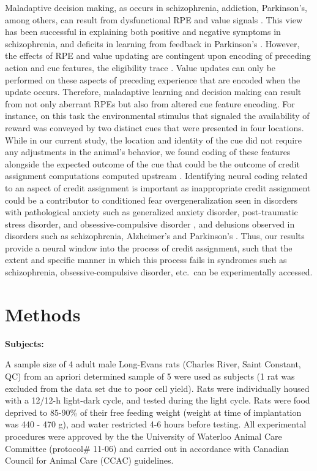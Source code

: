 \documentclass[11pt]{article}
\let\cite=\citep
\begin{document}
Maladaptive decision making, as occurs in schizophrenia, addiction, Parkinson's, among others, can result from dysfunctional RPE and value signals \cite{Frank2004,Gradin2011,Maia2011}. This view has been successful in explaining both positive and negative symptoms in schizophrenia, and deficits in learning from feedback in Parkinson's \cite{Frank2004,Gradin2011}. However, the effects of RPE and value updating are contingent upon encoding of preceding action and cue features, the eligibility trace \cite{sutton1998,Lee2012}. Value updates can only be performed on these aspects of preceding experience that are encoded when the update occurs. Therefore, maladaptive learning and decision making can result from not only aberrant RPEs but also from altered cue feature encoding. For instance, on this task the environmental stimulus that signaled the availability of reward was conveyed by two distinct cues that were presented in four locations. While in our current study, the location and identity of the cue did not require any adjustments in the animal’s behavior, we found coding of these features alongside the expected outcome of the cue that could be the outcome of credit assignment computations computed upstream \cite{Chau2015,Akaishi2016,Asaad2017,Noonan2017}. Identifying neural coding related to an aspect of credit assignment is important as inappropriate credit assignment could be a contributor to conditioned fear overgeneralization seen in disorders with pathological anxiety such as generalized anxiety disorder, post-traumatic stress disorder, and obsessive-compulsive disorder \cite{Kaczkurkin2013,Lissek2014,Kaczkurkin2017}, and delusions observed in disorders such as schizophrenia, Alzheimer's and Parkinson's \cite{Kapur2003,Corlett2010}. Thus, our results provide a neural window into the process of credit assignment, such that the extent and specific manner in which this process fails in syndromes such as schizophrenia, obsessive-compulsive disorder, etc.\ can be experimentally accessed.

\section*{Methods}

{\bf Subjects:}

A sample size of 4 adult male Long-Evans rats (Charles River, Saint Constant, QC) from an apriori determined sample of 5 
were used as subjects (1 rat was excluded from the data set due to poor cell yield). Rats were individually housed with a 12/12-h
light-dark cycle, and tested during the light cycle. Rats were food
deprived to 85-90\% of their free feeding weight (weight at time of
implantation was 440 - 470 g), and water restricted 4-6 hours before
testing. All experimental procedures were approved by the the
University of Waterloo Animal Care Committee (protocol\# 11-06) and
carried out in accordance with Canadian Council for Animal Care (CCAC)
guidelines.
\end{document}
